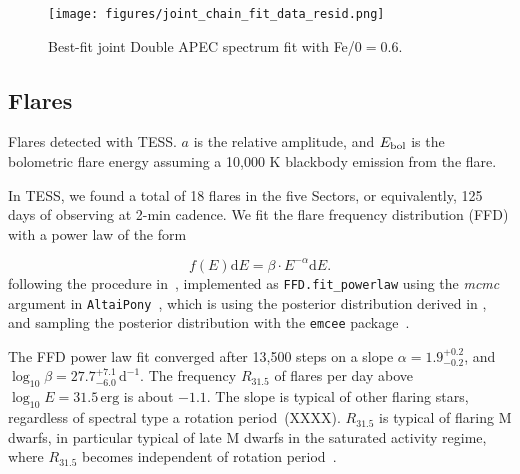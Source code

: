 \documentclass[twocolumn]{aastex631}
\begin{document}
\begin{figure}
    \begin{centering}
        \texttt{[image: figures/joint\_chain\_fit\_data\_resid.png]}
        \caption{
         Best-fit joint Double APEC spectrum fit with Fe/0$=0.6$.
        }
        \label{fig:spec_joint_all}
    \end{centering}
\end{figure}


\subsection{Flares}
\label{sec:res:flares}



\begin{table}
\centering
    \caption{Flares detected with TESS. $a$ is the relative amplitude, and $E_{\rm bol}$ is the bolometric flare energy assuming a 10,000 K blackbody emission from the flare.}
    
        \label{tab:flares}
\end{table}


In TESS, we found a total of 18 flares in the five Sectors, or equivalently, 125 days of observing at 2-min cadence. We fit the flare frequency distribution (FFD) with a power law of the form

\begin{equation}
    f(E) \mathrm{d} E = \beta \cdot E^{-\alpha} \mathrm{d} E.
\end{equation}
following the procedure in~\citep{ilin2021flares}, implemented as \texttt{FFD.fit\_powerlaw} using the \textit{mcmc} argument in \texttt{AltaiPony}~\citep{ilin2021altaipony}, which is using the posterior distribution derived in \citet{wheatland2004bayesian}, and sampling the posterior distribution with the \texttt{emcee} package~\citep{foreman-mackey2013emcee}.

The FFD power law fit converged after 13,500 steps on a slope $\alpha = 1.9_{-0.2}^{+0.2}$, and $\log_{10}\beta=27.7_{-6.0}^{+7.1}\,\mathrm{d}^{-1}$. The frequency $R_{31.5}$ of flares per day above $\log_{10} E = 31.5\,\mathrm{erg}$ is about $-1.1$. The slope is typical of other flaring stars, regardless of spectral type a rotation period~(XXXX). $R_{31.5}$ is typical of flaring M dwarfs, in particular typical of late M dwarfs in the saturated activity regime, where $R_{31.5}$ becomes independent of rotation period~\citep{medina2020flare,murray2022study}. 
\end{document}
